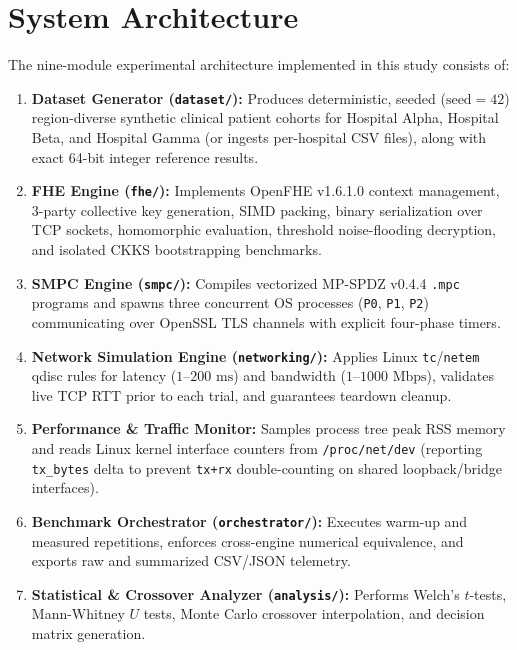 \documentclass[conference]{IEEEtran}
\begin{document}
\section{System Architecture}
The nine-module experimental architecture implemented in this study consists of:
\begin{enumerate}
    \item \textbf{Dataset Generator (\texttt{dataset/}):} Produces deterministic, seeded ($\text{seed}=42$) region-diverse synthetic clinical patient cohorts for Hospital Alpha, Hospital Beta, and Hospital Gamma (or ingests per-hospital CSV files), along with exact 64-bit integer reference results.
    \item \textbf{FHE Engine (\texttt{fhe/}):} Implements OpenFHE v1.6.1.0 context management, 3-party collective key generation, SIMD packing, binary serialization over TCP sockets, homomorphic evaluation, threshold noise-flooding decryption, and isolated CKKS bootstrapping benchmarks.
    \item \textbf{SMPC Engine (\texttt{smpc/}):} Compiles vectorized MP-SPDZ v0.4.4 \texttt{.mpc} programs and spawns three concurrent OS processes (\texttt{P0}, \texttt{P1}, \texttt{P2}) communicating over OpenSSL TLS channels with explicit four-phase timers.
    \item \textbf{Network Simulation Engine (\texttt{networking/}):} Applies Linux \texttt{tc}/\texttt{netem} qdisc rules for latency ($1$--$200\text{ ms}$) and bandwidth ($1$--$1000\text{ Mbps}$), validates live TCP RTT prior to each trial, and guarantees teardown cleanup.
    \item \textbf{Performance \& Traffic Monitor:} Samples process tree peak RSS memory and reads Linux kernel interface counters from \texttt{/proc/net/dev} (reporting \texttt{tx\_bytes} delta to prevent \texttt{tx+rx} double-counting on shared loopback/bridge interfaces).
    \item \textbf{Benchmark Orchestrator (\texttt{orchestrator/}):} Executes warm-up and measured repetitions, enforces cross-engine numerical equivalence, and exports raw and summarized CSV/JSON telemetry.
    \item \textbf{Statistical \& Crossover Analyzer (\texttt{analysis/}):} Performs Welch's $t$-tests, Mann-Whitney $U$ tests, Monte Carlo crossover interpolation, and decision matrix generation.
\end{enumerate}
\end{document}
